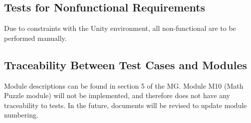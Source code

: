 \documentclass[12pt, titlepage]{article}
\begin{document}
\subsection{Tests for Nonfunctional Requirements}
Due to constraints with the Unity environment, all non-functional are to be performed manually. 


		


					
					
					
					
					

					
					
					
					




\subsection{Traceability Between Test Cases and Modules}
Module descriptions can be found in section 5 of the MG. Module M10 (Math Puzzle module) will not be implemented, and therefore does not have any traceability to tests. In the future, documents will be revised to update module numbering.
\end{document}
